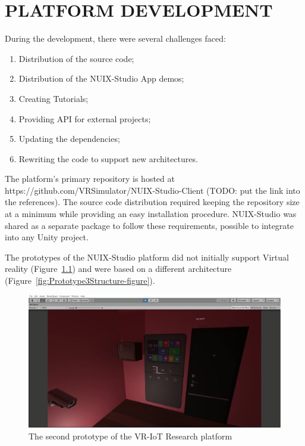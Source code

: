 
\chapter{PLATFORM DEVELOPMENT}

During the development, there were several challenges faced:
\begin{enumerate}
    \item Distribution of the source code;
    \item Distribution of the NUIX-Studio App demos;
    \item Creating Tutorials;
    \item Providing API for external projects;
    \item Updating the dependencies;
    \item Rewriting the code to support new architectures.
\end{enumerate}

The platform's primary repository is hosted at https://github.com/VRSimulator/NUIX-Studio-Client (TODO: put the link into the references). The source code distribution required keeping the repository size at a minimum while providing an easy installation procedure. NUIX-Studio was shared as a separate package to follow these requirements, possible to integrate into any Unity project.

The prototypes of the NUIX-Studio platform did not initially support Virtual reality (Figure~\ref{fig:Prototype2-figure}) and were based on a different architecture (Figure~\ref{fig:Prototype3Structure-figure}).


\begin{figure}
  \centering
  \includegraphics[width=0.6\linewidth]{figures/Prototype2.png}
  \caption{The second prototype of the VR-IoT Research platform}
  \label{fig:Prototype2-figure}
\end{figure}


